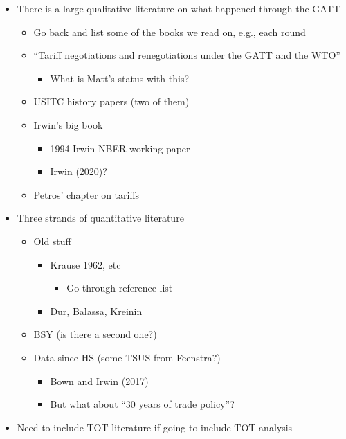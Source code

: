\documentclass[
  12pt,
]{article}
\providecommand{\tightlist}{%
  \setlength{\itemsep}{0pt}\setlength{\parskip}{0pt}}
\begin{document}
\begin{itemize}
\item
  There is a large qualitative literature on what happened through the GATT

  \begin{itemize}
  \item
    Go back and list some of the books we read on, e.g., each round
  \item
    ``Tariff negotiations and renegotiations under the GATT and the WTO''

    \begin{itemize}
    \tightlist
    \item
      What is Matt's status with this?
    \end{itemize}
  \item
    USITC history papers (two of them)
  \item
    Irwin's big book

    \begin{itemize}
    \tightlist
    \item
      1994 Irwin NBER working paper
    \item
      Irwin (2020)?
    \end{itemize}
  \item
    Petros' chapter on tariffs
  \end{itemize}
\item
  Three strands of quantitative literature

  \begin{itemize}
  \item
    Old stuff

    \begin{itemize}
    \item
      Krause 1962, etc

      \begin{itemize}
      \tightlist
      \item
        Go through reference list
      \end{itemize}
    \item
      Dur, Balassa, Kreinin
    \end{itemize}
  \item
    BSY (is there a second one?)
  \item
    Data since HS (some TSUS from Feenstra?)

    \begin{itemize}
    \item
      Bown and Irwin (2017)
    \item
      But what about ``30 years of trade policy''?
    \end{itemize}
  \end{itemize}
\item
  Need to include TOT literature if going to include TOT analysis
\end{itemize}
\end{document}
